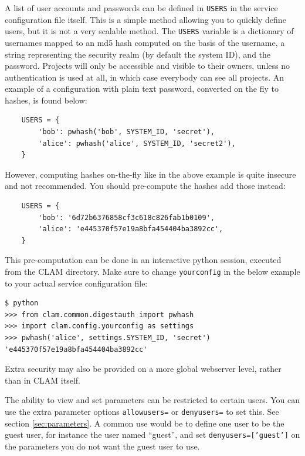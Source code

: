 \documentclass[a4paper,12pt]{report}
\begin{document}
A list of user accounts and passwords can be defined in \texttt{USERS} in the
service configuration file itself. This is a simple method allowing you to
quickly define users, but it is not a very scalable method. The \texttt{USERS}
variable is a dictionary of usernames mapped to an md5 hash computed on the
basis of the username, a string representing the security realm (by default the
system ID), and the password. Projects will only be accessible and visible to
their owners, unless no authentication is used at all, in which case everybody
can see all projects. An example of a configuration with plain text password,
converted on the fly to hashes, is found below:

\begin{verbatim}
    USERS = {
        'bob': pwhash('bob', SYSTEM_ID, 'secret'), 
		'alice': pwhash('alice', SYSTEM_ID, 'secret2'),
    }
\end{verbatim}

However, computing hashes on-the-fly like in the above example is quite
insecure and not recommended. You should pre-compute the hashes add those
instead:

\begin{verbatim}
    USERS = {
        'bob': '6d72b6376858cf3c618c826fab1b0109',
		'alice': 'e445370f57e19a8bfa454404ba3892cc',
    }
\end{verbatim}

This pre-computation can be done in an interactive python session, executed from
the CLAM directory. Make sure to change \texttt{yourconfig} in the below
example to your actual service configuration file:

\begin{verbatim}
$ python
>>> from clam.common.digestauth import pwhash
>>> import clam.config.yourconfig as settings
>>> pwhash('alice', settings.SYSTEM_ID, 'secret')
'e445370f57e19a8bfa454404ba3892cc'
\end{verbatim}


Extra security may also be provided on a more global webserver level, rather than in CLAM itself.

The ability to view and set parameters can be restricted to certain users. You
can use the extra parameter options \texttt{allowusers=} or \texttt{denyusers=}
to set this. See section \ref{sec:parameters}. A common use would be to define
one user to be the guest user, for instance the user named ``guest'', and set
\texttt{denyusers=['guest']} on the parameters you do not want the guest user
to use.
\end{document}
